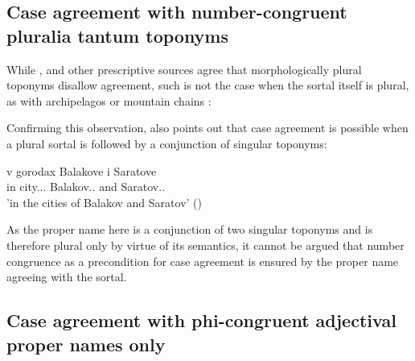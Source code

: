 \documentclass[output=paper,colorlinks,citecolor=brown]{langscibook}
\begin{document}
\subsection{Case agreement with number-congruent pluralia tantum toponyms}\label{mat:sec:case-agreement-number-congruent-pluralia}

While \citet{GraudinaKatlinskaja1976}, \citet{RozentalKabanova1998} and other prescriptive sources agree that morphologically plural toponyms disallow agreement, such is not the case when the sortal itself is plural, as with archipelagos  or mountain chains :

\ea\label{mat:ex:maldivy-alpy}
\label{mat:ex:maldivy-alpy-a}
\z
\z

\noindent Confirming this observation, \citet{Logvinova2018} also points out that case agreement is possible when a plural sortal is followed by a conjunction of singular toponyms:

\ea\label{mat:ex:balakov-saratov}
\gll v	gorodax	Balakove	i	Saratove \\
in	city.{\MASC}.{\PL}.{\LOC}	Balakov.{\MASC}.{\LOC}	and	Saratov.{\MASC}.{\LOC}\\
\glt 'in the cities of Balakov and Saratov' \hfill (\citealt{Logvinova2018}) 
\z

\noindent As the proper name here is a conjunction of two singular toponyms and is therefore plural only by virtue of its semantics, it cannot be argued that number congruence as a precondition for case agreement is ensured by the proper name agreeing with the sortal.

\subsection{Case agreement with phi-congruent adjectival proper names only}\label{mat:sec:case-agreement-phiCongruent}
\end{document}

